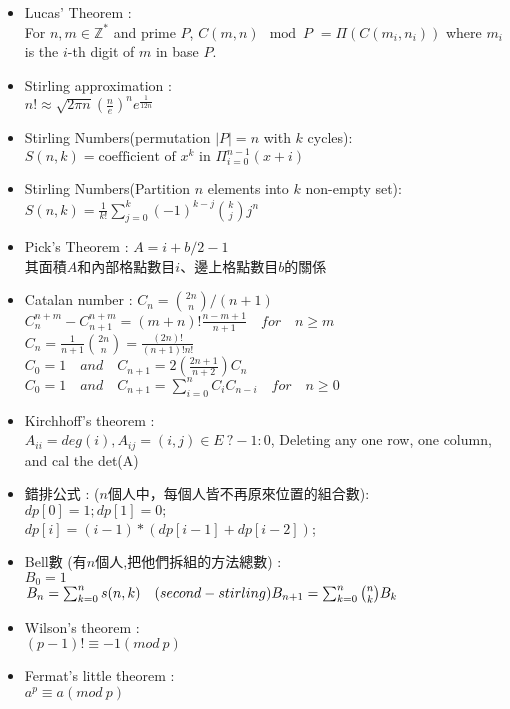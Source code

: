\begin{itemize}
\item Lucas’ Theorem :\\
  For $n, m \in \mathbb{Z}^{*}$ and prime $P$,
  $C(m,n) \mod P$
	$= \Pi ( C(m_i,n_i) )$
  where $m_i$ is the $i$-th digit of $m$ in base $P$.
\item Stirling approximation : \\
  $n!\approx\sqrt{ 2 \pi n}(\frac{n}{e})^{n}e^\frac{1}{12n}$
\item Stirling Numbers(permutation $|P|=n$ with $k$ cycles): \\
  $S(n,k) = \text{coefficient of }x^k \text{ in } \Pi_{i=0}^{n-1} (x+i)$
\item Stirling Numbers(Partition $n$ elements into $k$ non-empty set): \\
  $S(n,k) = \frac{1}{k!} \sum\limits_{j=0}^k (-1)^{k-j} {k \choose j} j^n$
\item Pick’s Theorem : $A = i + b/2 - 1$\\
  其面積$A$和內部格點數目$i$、邊上格點數目$b$的關係
\item Catalan number : $C_n = {2n \choose n}/(n+1)$\\
  $C^{n+m}_{n}-C^{n+m}_{n+1} = (m+n)! \frac{n-m+1}{n+1}\quad for \quad  n \ge m$\\
  $C_n = \frac{1}{n+1}{2n \choose n} = \frac{(2n)!}{(n+1)!n!}$\\
  $C_0 = 1 \quad  and \quad C_{n+1}= 2(\frac{2n+1}{n+2})C_n$\\
  $C_0 = 1 \quad  and \quad C_{n+1} = \sum_{i=0}^{n} C_iC_{n-i} \quad for \quad  n \ge 0$
\item Kirchhoff's theorem :\\
  $A_{ii} = deg(i), A_{ij} = (i,j) \in E\ ? -1 : 0$,
  Deleting any one row, one column, and cal the det(A)
\item 錯排公式 :  ($n$個人中，每個人皆不再原來位置的組合數): \\
  $dp[0]=1;dp[1]=0;$\\
  $dp[i]=(i-1)*(dp[i-1]+dp[i-2])$;
\item Bell數 (有$n$個人,把他們拆組的方法總數) : \\
  $B_0= 1$\\
  $B_n= \sum_{k=0}^{n} s(n,k)\quad (second-stirling)\\
  B_{n+1}= \sum_{k=0}^{n}{n \choose k} B_k$
\item Wilson's theorem :\\
  $(p-1)! \equiv -1 (mod \ p)$
\item Fermat's little theorem :\\
  $a^p \equiv a (mod \ p)$
\end{itemize}